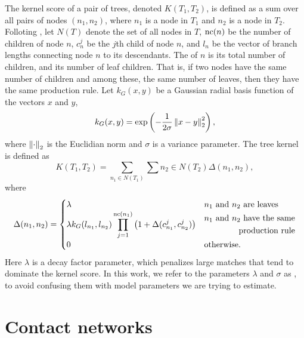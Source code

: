 The kernel score of a pair of trees, denoted $K(T_1, T_2)$, is defined as a sum
over all pairs of nodes $(n_1, n_2)$, where $n_1$ is a node in $T_1$ and $n_2$
is a node in $T_2$. Folloting \textcite{poon2013mapping}, let $N(T)$ denote the
set of all nodes in $T$, $\operatorname{nc}(n)$ be the number of children of node $n$,
$c_n^{j}$ be the $j$th child of node $n$, and $l_n$ be the vector of branch
lengths connecting node $n$ to its descendants. The  of
$n$ is its total number of children, and its number of leaf children. That is,
if two nodes have the same number of children and among these, the same number
of leaves, then they have the same production rule. Let $k_G(x, y)$ be a
Gaussian radial basis function of the vectors $x$ and $y$,
\[
  k_G(x, y) = \exp\left(-\frac{1}{2\sigma} \left\lVert x - y\right\rVert_2^2\right),
\]
where $\left\lVert\cdot\right\rVert_2$ is the Euclidian norm and $\sigma$ is a variance
parameter. The tree kernel is defined as 
\[
  K(T_1, T_2) = \sum_{n_1 \in N(T_1)} \sum{n_2 \in N(T_2)} \Delta (n_1, n_2),
\]
where
\[
  \Delta(n_1, n_2) =
  \begin{cases}
    \lambda & n_1 \text{ and } n_2 \text{ are leaves} \\
    \lambda k_G(l_{n_1}, l_{n_2}) \displaystyle\prod_{j=1}^{\operatorname{nc}(n_1)} \left(1 +
    \Delta(c_{n_1}^j, c_{n_2}^j) \right) & \begin{aligned} n_1 \text{ and } n_2 \text{ have the same} \\ \text{production rule} \end{aligned} \\
    0 & \text{otherwise}.

  \end{cases}
\]
Here $\lambda$ is a decay factor parameter, which penalizes large matches that
tend to dominate the kernel score. In this work, we refer to the parameters
$\lambda$ and $\sigma$ as , to avoid confusing them with
model parameters we are trying to estimate.


\section{Contact networks}
\label{sec:contactnet}

